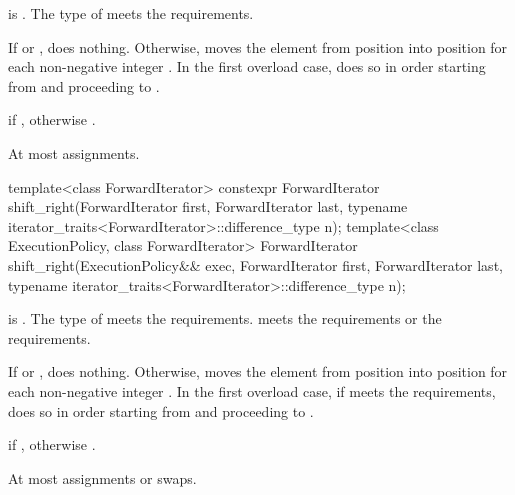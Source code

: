 \begin{itemdescr}
\pnum
\expects
{} is .
The type of  meets
the  requirements.

\pnum
\effects
If  or , does nothing.
Otherwise, moves the element
from position 
into position 
for each non-negative integer .
In the first overload case, does so in order starting
from  and proceeding to .

\pnum
\returns
{}
if ,
otherwise .

\pnum
\complexity
At most  assignments.
\end{itemdescr}

%
\begin{itemdecl}
template<class ForwardIterator>
  constexpr ForwardIterator
    shift_right(ForwardIterator first, ForwardIterator last,
                typename iterator_traits<ForwardIterator>::difference_type n);
template<class ExecutionPolicy, class ForwardIterator>
  ForwardIterator
    shift_right(ExecutionPolicy&& exec, ForwardIterator first, ForwardIterator last,
                typename iterator_traits<ForwardIterator>::difference_type n);
\end{itemdecl}

\begin{itemdescr}
\pnum
\expects
{} is .
The type of  meets
the  requirements.
 meets
the  requirements or
the  requirements.

\pnum
\effects
If  or , does nothing.
Otherwise, moves the element
from position  into position 
for each non-negative integer .
In the first overload case, if  meets
the  requirements,
does so in order starting
from  and proceeding to .

\pnum
\returns
{}
if ,
otherwise .

\pnum
\complexity
At most  assignments or swaps.
\end{itemdescr}

